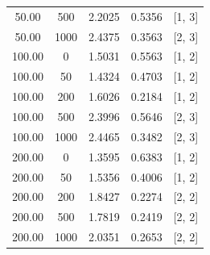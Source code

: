 \documentclass{article}
\begin{document}
\begin{table}[h]
\begin{tabular}{ccccc}
50.00 & 500  & 2.2025 & 0.5356 & [1, 3] \\
50.00 & 1000 & 2.4375 & 0.3563 & [2, 3] \\
100.00 & 0    & 1.5031 & 0.5563 & [1, 2] \\
100.00 & 50   & 1.4324 & 0.4703 & [1, 2] \\
100.00 & 200  & 1.6026 & 0.2184 & [1, 2] \\
100.00 & 500  & 2.3996 & 0.5646 & [2, 3] \\
100.00 & 1000 & 2.4465 & 0.3482 & [2, 3] \\
200.00 & 0    & 1.3595 & 0.6383 & [1, 2] \\
200.00 & 50   & 1.5356 & 0.4006 & [1, 2] \\
200.00 & 200  & 1.8427 & 0.2274 & [2, 2] \\
200.00 & 500  & 1.7819 & 0.2419 & [2, 2] \\
200.00 & 1000 & 2.0351 & 0.2653 & [2, 2] \\
\hline
\end{tabular}
\end{table}
\end{document}
